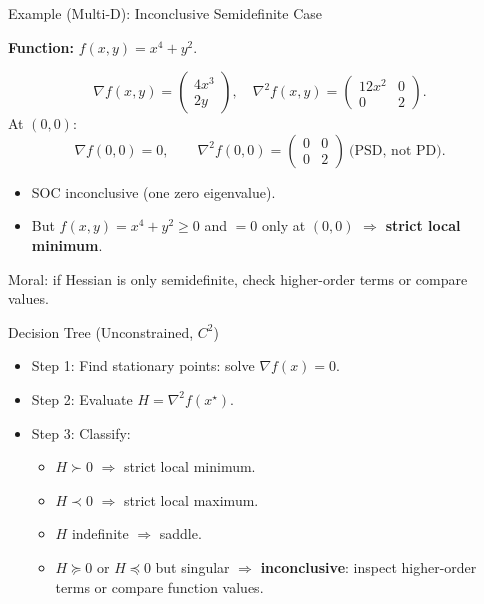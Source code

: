 \documentclass[aspectratio=169]{beamer}
\begin{document}
\begin{frame}{Example (Multi-D): Inconclusive Semidefinite Case}

\textbf{Function: } \(f(x,y)=x^4+y^2.\)

\[
\nabla f(x,y)=\begin{pmatrix}4x^3\\2y\end{pmatrix},
\quad
\nabla^2 f(x,y)=
\begin{pmatrix}
12x^2 & 0\\
0 & 2
\end{pmatrix}.
\]
\pause
At \((0,0)\):
\[
\nabla f(0,0)=0,\qquad
\nabla^2 f(0,0)=\begin{pmatrix}0&0\\0&2\end{pmatrix}\ \text{(PSD, not PD)}.
\]
\pause
\begin{itemize}
  \item SOC inconclusive (one zero eigenvalue).
  \item But \(f(x,y)=x^4+y^2\ge 0\) and \(=0\) only at \((0,0)\) \(\Rightarrow\) \textbf{strict local minimum}.
\end{itemize}

\textcolor{BootcampBlueDark}{Moral:} if Hessian is only semidefinite, check higher-order terms or compare values.

\end{frame}

\begin{frame}{Decision Tree (Unconstrained, $C^2$)}

\begin{itemize}
  \item Step 1: Find stationary points: solve \(\nabla f(x)=0\).
  \pause
  \item Step 2: Evaluate \(H=\nabla^2 f(x^\star)\).
  \pause
  \item Step 3: Classify:
  \begin{itemize}
     \item \(H\succ 0\) \(\Rightarrow\) strict local minimum.
     \item \(H\prec 0\) \(\Rightarrow\) strict local maximum.
     \item \(H\) indefinite \(\Rightarrow\) saddle.
     \item \(H\succeq 0\) or \(H\preceq 0\) but singular \(\Rightarrow\) \textbf{inconclusive}: inspect higher-order terms or compare function values.
     \pause
  \end{itemize}
\end{itemize}

\end{frame}
\end{document}
